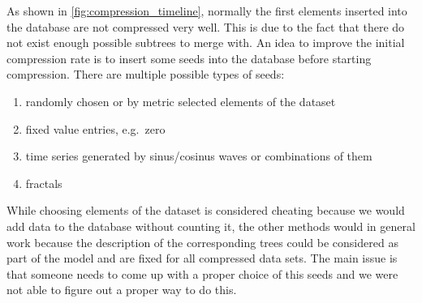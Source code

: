 As shown in \autoref{fig:compression_timeline}, normally the first elements inserted into the database are not compressed very well. This is due to the fact that there do not exist enough possible subtrees to merge with. An idea to improve the initial compression rate is to insert some seeds into the database before starting compression. There are multiple possible types of seeds:

\begin{enumerate}
    \item randomly chosen or by metric selected elements of the dataset
    \item fixed value entries, e.g.\ zero
    \item time series generated by sinus/cosinus waves or combinations of them
    \item fractals
\end{enumerate}

While choosing elements of the dataset is considered cheating because we would add data to the database without counting it, the other methods would in general work because the description of the corresponding trees could be considered as part of the model and are fixed for all compressed data sets. The main issue is that someone needs to come up with a proper choice of this seeds and we were not able to figure out a proper way to do this.
